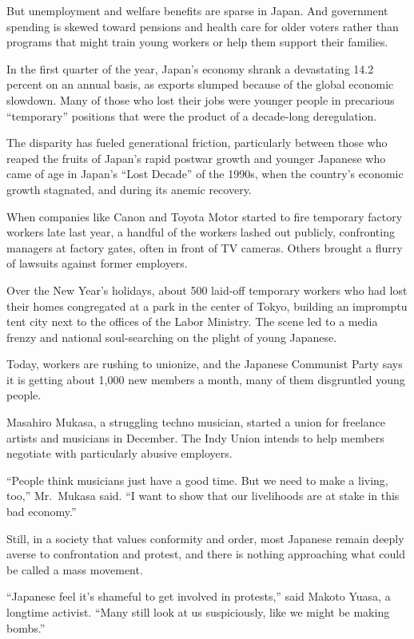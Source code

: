 ﻿\documentclass[12pt]{article}
\begin{document}
But unemployment and welfare benefits are sparse in Japan. And government spending is skewed toward
pensions and health care for older voters rather than programs that might train young workers or
help them support their families.

In the first quarter of the year, Japan's economy shrank a devastating 14.2 percent on an annual
basis, as exports slumped because of the global economic slowdown. Many of those who lost their jobs
were younger people in precarious ``temporary'' positions that were the product of a decade-long
deregulation.

The disparity has fueled generational friction, particularly between those who reaped the fruits of
Japan's rapid postwar growth and younger Japanese who came of age in Japan's ``Lost Decade'' of the
1990s, when the country's economic growth stagnated, and during its anemic recovery.

When companies like Canon and Toyota Motor started to fire temporary factory workers late last year,
a handful of the workers lashed out publicly, confronting managers at factory gates, often in front
of TV cameras. Others brought a flurry of lawsuits against former employers.

Over the New Year's holidays, about 500 laid-off temporary workers who had lost their homes
congregated at a park in the center of Tokyo, building an impromptu tent city next to the offices of
the Labor Ministry. The scene led to a media frenzy and national soul-searching on the plight of
young Japanese.

Today, workers are rushing to unionize, and the Japanese Communist Party says it is getting about
1,000 new members a month, many of them disgruntled young people.

Masahiro Mukasa, a struggling techno musician, started a union for freelance artists and musicians
in December. The Indy Union intends to help members negotiate with particularly abusive employers.

``People think musicians just have a good time. But we need to make a living, too,'' Mr.~Mukasa
said. ``I want to show that our livelihoods are at stake in this bad economy.''

Still, in a society that values conformity and order, most Japanese remain deeply averse to
confrontation and protest, and there is nothing approaching what could be called a mass movement.

``Japanese feel it's shameful to get involved in protests,'' said Makoto Yuasa, a longtime activist.
``Many still look at us suspiciously, like we might be making bombs.''
\end{document}
